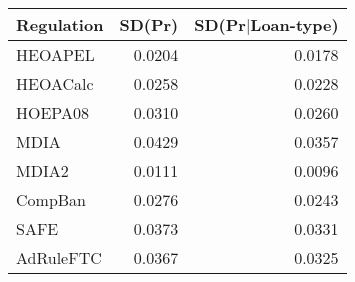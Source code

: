 \begin{tabular}{lrr}
  \hline
Regulation & SD(Pr) & SD(Pr$|$Loan-type) \\ 
  \hline
HEOAPEL & 0.0204 & 0.0178 \\ 
  HEOACalc & 0.0258 & 0.0228 \\ 
  HOEPA08 & 0.0310 & 0.0260 \\ 
  MDIA & 0.0429 & 0.0357 \\ 
  MDIA2 & 0.0111 & 0.0096 \\ 
  CompBan & 0.0276 & 0.0243 \\ 
  SAFE & 0.0373 & 0.0331 \\ 
  AdRuleFTC & 0.0367 & 0.0325 \\ 
   \hline
\end{tabular}
